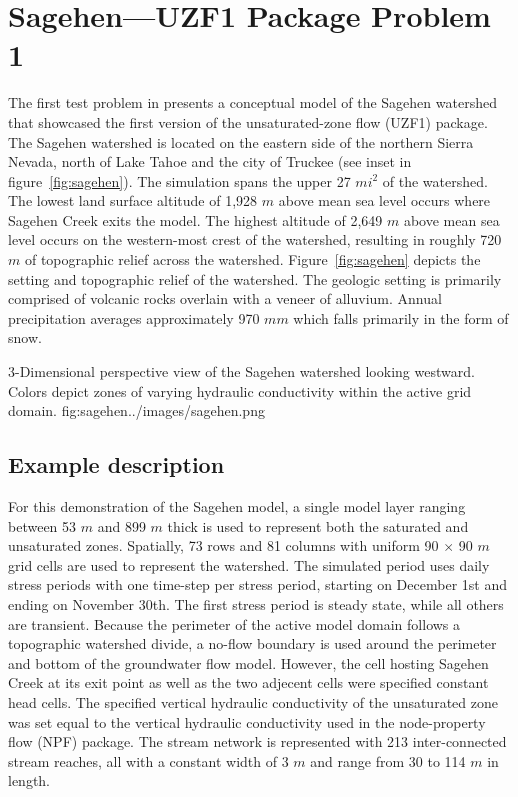 \section{Sagehen---UZF1 Package Problem 1}

The first test problem in \cite{UZF} presents a conceptual model of the Sagehen watershed that showcased the first version of the unsaturated-zone flow (UZF1) package. The Sagehen watershed is located on the eastern side of the northern Sierra Nevada, north of Lake Tahoe and the city of Truckee (see inset in figure~\ref{fig:sagehen}). The simulation spans the upper 27 $mi^2$ of the watershed.  The lowest land surface altitude of 1,928 $m$ above mean sea level occurs where Sagehen Creek exits the model.  The highest altitude of 2,649 $m$ above mean sea level occurs on the western-most crest of the watershed, resulting in roughly 720 $m$ of topographic relief across the watershed.  Figure~\ref{fig:sagehen} depicts the setting and topographic relief of the watershed. The geologic setting is primarily comprised of volcanic rocks overlain with a veneer of alluvium. Annual precipitation averages approximately 970 $mm$ which falls primarily in the form of snow.  

\begin{StandardFigure}
	{3-Dimensional perspective view of the Sagehen watershed looking westward.  Colors depict zones of varying hydraulic conductivity within the active grid domain.}
	{fig:sagehen}{../images/sagehen.png}
\end{StandardFigure}

\subsection{Example description}

For this \mf demonstration of the Sagehen model, a single model layer ranging between 53 $m$ and 899 $m$ thick is used to represent both the saturated and unsaturated zones.  Spatially, 73 rows and 81 columns with uniform 90 $\times$ 90 $m$ grid cells are used to represent the watershed.  The simulated period uses daily stress periods with one time-step per stress period, starting on December 1st and ending on November 30th.  The first stress period is steady state, while all others are transient.  Because the perimeter of the active model domain follows a topographic watershed divide, a no-flow boundary is used around the perimeter and bottom of the groundwater flow model.  However, the cell hosting Sagehen Creek at its exit point as well as the two adjecent cells were specified constant head cells.  The specified vertical hydraulic conductivity of the unsaturated zone was set equal to the vertical hydraulic conductivity used in the node-property flow (NPF) package. The stream network is represented with 213 inter-connected stream reaches, all with a constant width of 3 $m$ and range from 30 to 114 $m$ in length.  

